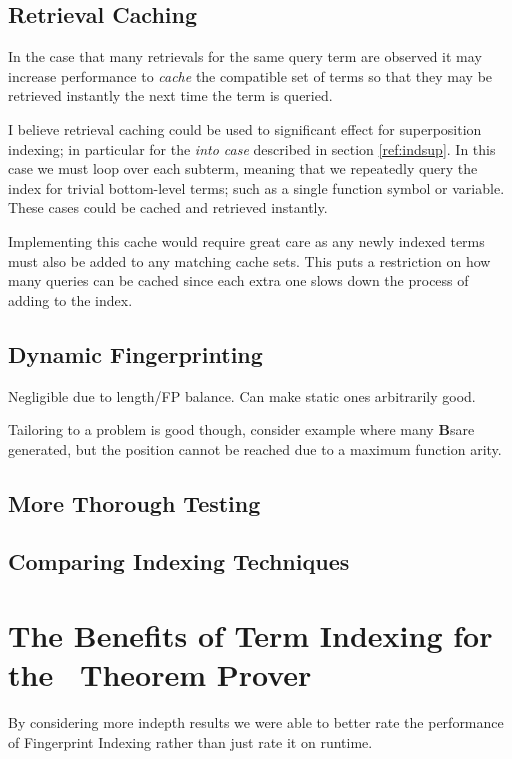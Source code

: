 \subsection{Retrieval Caching}
In the case that many retrievals for the same query term are observed it may increase
performance to \emph{cache} the compatible set of terms so that they may be retrieved
instantly the next time the term is queried.

I believe retrieval caching could be used to significant effect for superposition
indexing; in particular for the \emph{into case} described in section \ref{ref:indsup}.
In this case we must loop over each subterm, meaning that we repeatedly query the index
for trivial bottom-level terms; such as a single function symbol or variable. These cases
could be cached and retrieved instantly.

Implementing this cache would require great care as any newly indexed terms must
also be added to any matching cache sets. This puts a restriction on how many queries
can be cached since each extra one slows down the process of adding to the index.

\subsection{Dynamic Fingerprinting}
Negligible due to length/FP balance. Can make static ones arbitrarily good.

Tailoring to a problem is good though, consider example where many \textbf{B}sare generated,
 but the position cannot be reached due to a maximum function arity.

\subsection{More Thorough Testing}

\subsection{Comparing Indexing Techniques}

\section{The Benefits of Term Indexing for the \Beagle\ Theorem Prover }
\label{sec:why}

By considering more indepth results we were able to better rate the performance
of Fingerprint Indexing rather than just rate it on runtime.

